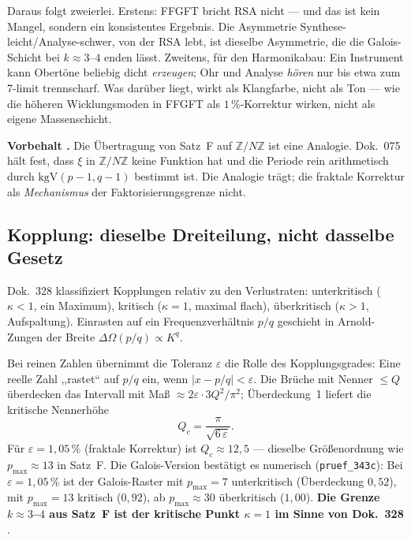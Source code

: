 Daraus folgt zweierlei. Erstens: FFGFT bricht RSA nicht --- und das ist kein
Mangel, sondern ein konsistentes Ergebnis. Die Asymmetrie
Synthese-leicht/Analyse-schwer, von der RSA lebt, ist dieselbe Asymmetrie, die
die Galois-Schicht bei $k \approx 3$--$4$ enden lässt. Zweitens, für den
Harmonikabau: Ein Instrument kann Obertöne beliebig dicht \emph{erzeugen}; Ohr
und Analyse \emph{hören} nur bis etwa zum 7-limit trennscharf. Was darüber
liegt, wirkt als Klangfarbe, nicht als Ton --- wie die höheren Wicklungsmoden
in FFGFT als $1\,\%$-Korrektur wirken, nicht als eigene Massenschicht.

\textbf{Vorbehalt \SM.} Die Übertragung von Satz~F auf $\mathbb{Z}/N\mathbb{Z}$
ist eine Analogie. Dok.~075 hält fest, dass $\xi$ in $\mathbb{Z}/N\mathbb{Z}$
keine Funktion hat und die Periode rein arithmetisch durch
$\mathrm{kgV}(p-1, q-1)$ bestimmt ist. Die Analogie trägt; die fraktale
Korrektur als \emph{Mechanismus} der Faktorisierungsgrenze nicht.

\subsection{Kopplung: dieselbe Dreiteilung, nicht dasselbe Gesetz}

Dok.~328 klassifiziert Kopplungen relativ zu den Verlustraten:
unterkritisch ($\kappa < 1$, ein Maximum), kritisch ($\kappa = 1$, maximal
flach), überkritisch ($\kappa > 1$, Aufspaltung). Einrasten auf ein
Frequenzverhältnis $p/q$ geschieht in Arnold-Zungen der Breite
$\Delta\Omega(p/q) \propto K^q$.

Bei reinen Zahlen übernimmt die Toleranz $\varepsilon$ die Rolle des
Kopplungsgrades: Eine reelle Zahl ,,rastet`` auf $p/q$ ein, wenn
$|x - p/q| < \varepsilon$. Die Brüche mit Nenner $\leq Q$ überdecken das
Intervall mit Maß $\approx 2\varepsilon \cdot 3Q^2/\pi^2$; Überdeckung~1
liefert die kritische Nennerhöhe \BM
\begin{equation}
  Q_c = \frac{\pi}{\sqrt{6\,\varepsilon}} .
\end{equation}
Für $\varepsilon = 1{,}05\,\%$ (fraktale Korrektur) ist $Q_c \approx 12{,}5$ ---
dieselbe Größenordnung wie $p_\mathrm{max} \approx 13$ in Satz~F. Die
Galois-Version bestätigt es numerisch (\texttt{pruef\_343c}): Bei
$\varepsilon = 1{,}05\,\%$ ist der Galois-Raster mit $p_\mathrm{max} = 7$
unterkritisch (Überdeckung $0{,}52$), mit $p_\mathrm{max} = 13$ kritisch
($0{,}92$), ab $p_\mathrm{max} \approx 30$ überkritisch ($1{,}00$).
\textbf{Die Grenze $k \approx 3$--$4$ aus Satz~F ist der kritische Punkt
$\kappa = 1$ im Sinne von Dok.~328} \BM.

